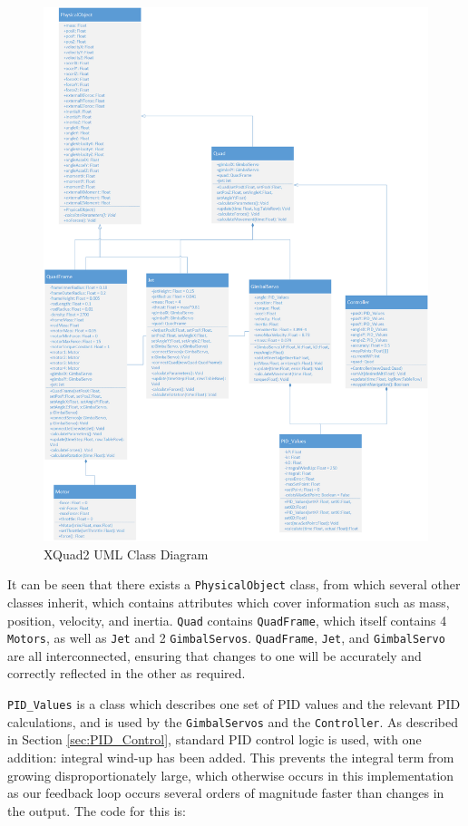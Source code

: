 \documentclass[11pt,twoside]{article}
\begin{document}
\begin{figure}
    \includegraphics[width=\linewidth]{XQuad_2_Class_Diagram}
    \caption{XQuad2 UML Class Diagram}
    \label{fig:XQuad_2_Class_Diagram}
\end{figure}

It can be seen that there exists a \lstinline|PhysicalObject| class, from which several other classes inherit, which contains attributes which cover information such as mass, position, velocity, and inertia. \lstinline|Quad| contains \lstinline|QuadFrame|, which itself contains 4 \lstinline|Motors|, as well as \lstinline|Jet| and 2 \lstinline|GimbalServos|. \lstinline|QuadFrame|, \lstinline|Jet|, and \lstinline|GimbalServo| are all interconnected, ensuring that changes to one will be accurately and correctly reflected in the other as required.

\lstinline|PID_Values| is a class which describes one set of PID values and the relevant PID calculations, and is used by the \lstinline|GimbalServos| and the \lstinline|Controller|. As described in Section \ref{sec:PID_Control}, standard PID control logic is used, with one addition: integral wind-up has been added. This prevents the integral term from growing disproportionately large, which otherwise occurs in this implementation as our feedback loop occurs several orders of magnitude faster than changes in the output. The code for this is:
\end{document}
